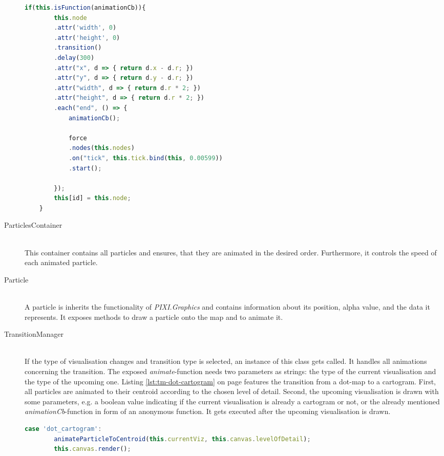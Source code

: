 \begin{description}
\begin{lstlisting}[language=JavaScript, caption={A small part of the draw-function of the pseudo Demers Cartogramm-class}, label={lst:cartogram-part-draw}]
    if(this.isFunction(animationCb)){
        this.node
        .attr('width', 0)
        .attr('height', 0)
        .transition()
        .delay(300)
        .attr("x", d => { return d.x - d.r; })
        .attr("y", d => { return d.y - d.r; })
        .attr("width", d => { return d.r * 2; })
        .attr("height", d => { return d.r * 2; })
        .each("end", () => {
            animationCb();

            force
            .nodes(this.nodes)
            .on("tick", this.tick.bind(this, 0.00599))
            .start();

        });
        this[id] = this.node;
    }
\end{lstlisting}

\item[ParticlesContainer] \hfill \\
This container contains all particles and ensures, that they are animated in the desired order. Furthermore, it controls the speed of each animated particle.

\item[Particle] \hfill \\
A particle is inherits the functionality of \textit{PIXI.Graphics} and contains information about its position, alpha value, and the data it represents. It exposes methods to draw a particle onto the map and to animate it.

\item[TransitionManager] \hfill \\
If the type of visualisation changes and transition type is selected, an instance of this class gets called. It handles all animations concerning the transition. The exposed \textit{animate}-function needs two parameters as strings: the type of the current visualisation and the type of the upcoming one. Listing \ref{lst:tm-dot-cartogram} on page \pageref{lst:tm-dot-cartogram} features the transition from a dot-map to a cartogram. First, all particles are animated to their centroid according to the chosen level of detail. Second, the upcoming visualisation is drawn with some parameters, e.g. a boolean value indicating if the current visualisation is already a cartogram or not, or the already mentioned \textit{animationCb}-function in form of an anonymous function. It gets executed after the upcoming visualisation is drawn.

\begin{lstlisting}[language=JavaScript, caption={Animate the transition from a dot-map to a cartogram.}, label={lst:tm-dot-cartogram}]
    case 'dot_cartogram':
        animateParticleToCentroid(this.currentViz, this.canvas.levelOfDetail);
        this.canvas.render();


\end{lstlisting}
\end{description}

